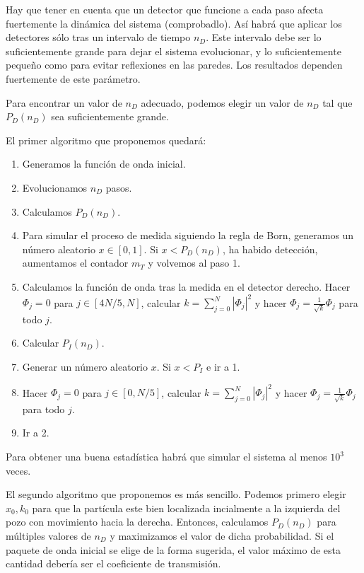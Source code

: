 \documentclass[12pt]{iopart}
\begin{document}
\begin{itemize}
Hay que tener en cuenta que un detector que funcione a cada paso afecta fuertemente la din\'amica del sistema (comprobadlo). As\'i habr\'a que aplicar los detectores s\'olo tras un intervalo de tiempo $n_D$. Este intervalo debe ser lo suficientemente grande para dejar el sistema evolucionar, y lo suficientemente peque\~no como para evitar reflexiones en las paredes. Los resultados dependen fuertemente de este par\'ametro. 

Para encontrar un valor de $n_D$ adecuado, podemos elegir un valor de $n_D$ tal que $P_D(n_D)$ sea suficientemente grande.

El primer algoritmo  que proponemos quedar\'a:

\begin{enumerate}
\item Generamos la funci\'on de onda inicial.
\item Evolucionamos $n_D$ pasos.
\item Calculamos $P_D(n_D)$.
\item Para simular el proceso de medida siguiendo la regla de Born, generamos un n\'umero aleatorio $x\in[0,1]$. Si $x<P_D(n_D)$, ha habido detección, aumentamos el contador $m_T$ y volvemos al paso 1.
\item Calculamos la función de onda tras la medida en el detector derecho. Hacer  $\Phi_{j}=0$ para $j\in[4N/5,N]$, calcular $k=\sum_{j=0}^N  \left| \Phi_{j}\right|^2$ y hacer $\Phi_{j}=\frac{1}{\sqrt{k}} \Phi_{j}$  para todo $j$.
\item Calcular $P_I(n_D)$. 
\item Generar un n\'umero aleatorio $x$. Si $x<P_I$ e ir a 1.
\item Hacer  $\Phi_{j}=0$ para $j\in[0,N/5]$, calcular $k=\sum_{j=0}^N  \left| \Phi_{j}\right|^2$ y hacer $\Phi_{j}=\frac{1}{\sqrt{k}} \Phi_{j}$  para todo $j$.
\item Ir a 2.
\end{enumerate}
Para obtener una buena estad\'istica habr\'a que simular el sistema al menos $10^3$ veces. 

El segundo algoritmo que proponemos es más sencillo.  Podemos primero elegir $x_0, k_0$ para que la partícula este bien localizada incialmente a la izquierda del pozo con movimiento hacia la derecha. Entonces, calculamos $P_D(n_D)$ para múltiples valores de $n_D$ y maximizamos el valor de dicha probabilidad. Si el paquete de onda inicial se elige de la forma sugerida, el valor máximo de esta cantidad debería ser el coeficiente de transmisión.


\end{itemize}
\end{document}
